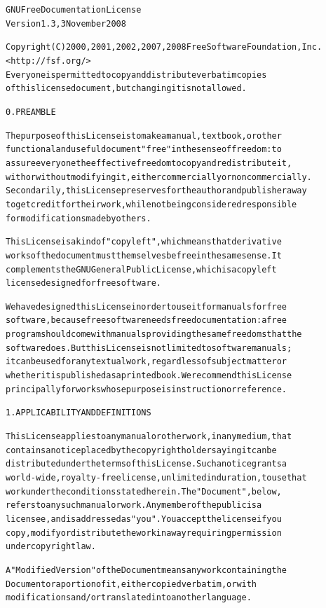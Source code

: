 \documentclass[DIV=12,%
               BCOR=0mm,%
               fontsize=10pt,%
               oneside,%
               paper=210mm:11in]{scrbook}
\begin{document}
\begin{alltt}
                GNU Free Documentation License
                 Version 1.3, 3 November 2008


 Copyright (C) 2000, 2001, 2002, 2007, 2008 Free Software Foundation, Inc.
     <http://fsf.org/>
 Everyone is permitted to copy and distribute verbatim copies
 of this license document, but changing it is not allowed.

0. PREAMBLE

The purpose of this License is to make a manual, textbook, or other
functional and useful document "free" in the sense of freedom: to
assure everyone the effective freedom to copy and redistribute it,
with or without modifying it, either commercially or noncommercially.
Secondarily, this License preserves for the author and publisher a way
to get credit for their work, while not being considered responsible
for modifications made by others.

This License is a kind of "copyleft", which means that derivative
works of the document must themselves be free in the same sense.  It
complements the GNU General Public License, which is a copyleft
license designed for free software.

We have designed this License in order to use it for manuals for free
software, because free software needs free documentation: a free
program should come with manuals providing the same freedoms that the
software does.  But this License is not limited to software manuals;
it can be used for any textual work, regardless of subject matter or
whether it is published as a printed book.  We recommend this License
principally for works whose purpose is instruction or reference.


1. APPLICABILITY AND DEFINITIONS

This License applies to any manual or other work, in any medium, that
contains a notice placed by the copyright holder saying it can be
distributed under the terms of this License.  Such a notice grants a
world-wide, royalty-free license, unlimited in duration, to use that
work under the conditions stated herein.  The "Document", below,
refers to any such manual or work.  Any member of the public is a
licensee, and is addressed as "you".  You accept the license if you
copy, modify or distribute the work in a way requiring permission
under copyright law.

A "Modified Version" of the Document means any work containing the
Document or a portion of it, either copied verbatim, or with
modifications and/or translated into another language.


\end{alltt}
\end{document}
